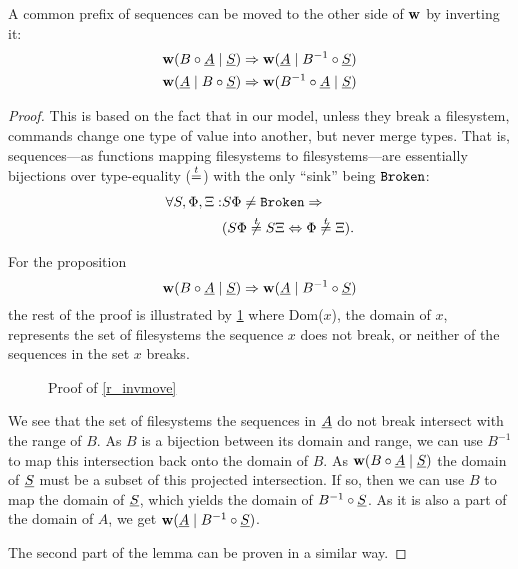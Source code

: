 \begin{mylem}\label{r_invmove}
A common prefix of sequences can be moved to the other side of $\mathbf{w}$ by inverting it:
\begin{gather*}
\mathbf{w}({B\circ \underline{A}}\mathrel{|}{\underline{S}}) \Rightarrow \mathbf{w}({\underline{A}}\mathrel{|}{B^{-1}\circ \underline{S}}) \\
\mathbf{w}({\underline{A}}\mathrel{|}{B\circ \underline{S}}) \Rightarrow \mathbf{w}({B^{-1}\circ \underline{A}}\mathrel{|}{\underline{S}})
\end{gather*}
\end{mylem}
\begin{proof}
This is based on the fact that in our model, unless they break a filesystem,
commands change one type of value into another, but never merge types.
That is,
sequences---as functions mapping filesystems to filesystems---are
essentially bijections over type-equality ($\stackrel{t}{=}$)
with the only ``sink'' being $\mathtt{Broken}$:
\begin{align*}
\forall S,\FS,\GS: &S\FS\neq\fsbroken \Rightarrow \\
&(S\FS\ntypeeq S\GS \Leftrightarrow \FS\ntypeeq \GS).
\end{align*}

For the proposition
\[ \mathbf{w}({B\circ \underline{A}}\mathrel{|}{\underline{S}}) \Rightarrow \mathbf{w}({\underline{A}}\mathrel{|}{B^{-1}\circ \underline{S}}) \]
the rest of the proof is illustrated by \cref{fig_invmove}
where Dom($x$), the domain of $x$, represents the set of filesystems
the sequence $x$ does not break, or neither of the sequences in the set $x$ breaks.

\begin{figure}[htb]

\caption{Proof of \cref{r_invmove}}\label{fig_invmove}
\end{figure}

We see that the set of filesystems the sequences in $\underline{A}$ do not break intersect with the range of $B$.
As $B$ is a bijection between its domain and range, we can use $B^{-1}$ to map this intersection back
onto the domain of $B$.
As $\mathbf{w}({B\circ \underline{A}}\mathrel{|}{\underline{S}})$ the domain of $\underline{S}$ must be a subset of this
projected intersection.
If so, then we can use $B$ to map the domain of $\underline{S}$, which yields the domain of $B^{-1}\circ \underline{S}$.
As it is also a part of the domain of $A$, we get $\mathbf{w}({\underline{A}}\mathrel{|}{B^{-1}\circ \underline{S}})$.

The second part of the lemma can be proven in a similar way.
\end{proof}


